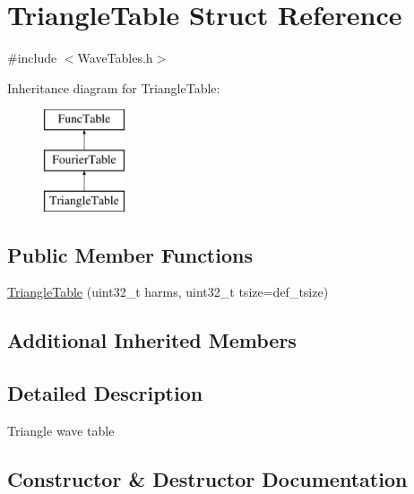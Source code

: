 \hypertarget{struct_triangle_table}{}\section{Triangle\+Table Struct Reference}
\label{struct_triangle_table}


{\ttfamily \#include $<$Wave\+Tables.\+h$>$}

Inheritance diagram for Triangle\+Table\+:\begin{figure}[H]
\begin{center}
\leavevmode
\includegraphics[height=3.000000cm]{struct_triangle_table}
\end{center}
\end{figure}
\subsection*{Public Member Functions}
\begin{DoxyCompactItemize}
\item 
\hyperlink{struct_triangle_table_a26a2345f91109060172b796ff9785299}{Triangle\+Table} (uint32\+\_\+t harms, uint32\+\_\+t tsize=def\+\_\+tsize)
\end{DoxyCompactItemize}
\subsection*{Additional Inherited Members}


\subsection{Detailed Description}
Triangle wave table 

\subsection{Constructor \& Destructor Documentation}
\mbox{\label{struct_triangle_table_a26a2345f91109060172b796ff9785299}} 
